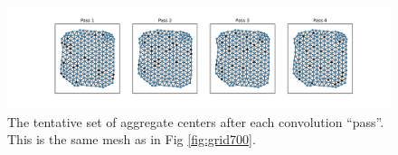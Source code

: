 \documentclass{article}
\begin{document}
\begin{figure}[h]
  \centering
  \includegraphics[width=\textwidth, trim=130 0 100 0, clip]{agg_passes.pdf}
  \caption{The tentative set of aggregate centers after each convolution ``pass''.  This is the same mesh as in Fig \ref{fig:grid700}.}
  \label{fig:agg_passes}
\end{figure}



\end{document}
